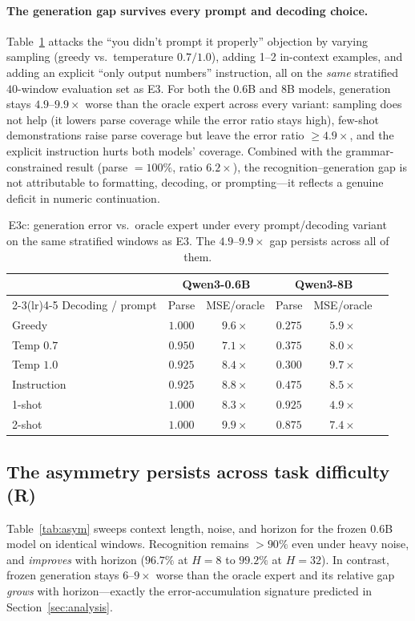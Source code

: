 \documentclass{article}
\begin{document}
\paragraph{The generation gap survives every prompt and decoding choice.}
Table~\ref{tab:genrob} attacks the ``you didn't prompt it properly'' objection
by varying sampling (greedy vs.\ temperature $0.7/1.0$), adding 1--2 in-context
examples, and adding an explicit ``only output numbers'' instruction, all on
the \emph{same} stratified $40$-window evaluation set as E3.  For both the
$0.6$B and $8$B models, generation stays $4.9$--$9.9\times$ worse than the
oracle expert across every variant: sampling does not help (it lowers parse
coverage while the error ratio stays high), few-shot demonstrations raise
parse coverage but leave the error ratio $\geq 4.9\times$, and the explicit
instruction hurts both models' coverage.  Combined with the
grammar-constrained result (parse $=100\%$, ratio $6.2\times$), the
recognition--generation gap is not attributable to formatting, decoding, or
prompting---it reflects a genuine deficit in numeric continuation.

\begin{table}[t]
\centering
\small
\begin{tabular}{lccccc}
\toprule
 & \multicolumn{2}{c}{Qwen3-0.6B} & \multicolumn{2}{c}{Qwen3-8B} \\
\cmidrule(lr){2-3}\cmidrule(lr){4-5}
Decoding / prompt & Parse & MSE/oracle & Parse & MSE/oracle \\
\midrule
Greedy & $1.000$ & $9.6\times$ & $0.275$ & $5.9\times$ \\
Temp $0.7$ & $0.950$ & $7.1\times$ & $0.375$ & $8.0\times$ \\
Temp $1.0$ & $0.925$ & $8.4\times$ & $0.300$ & $9.7\times$ \\
Instruction & $0.925$ & $8.8\times$ & $0.475$ & $8.5\times$ \\
1-shot & $1.000$ & $8.3\times$ & $0.925$ & $4.9\times$ \\
2-shot & $1.000$ & $9.9\times$ & $0.875$ & $7.4\times$ \\
\bottomrule
\end{tabular}
\caption{E3c: generation error vs.\ oracle expert under every prompt/decoding
variant on the same stratified windows as E3.  The $4.9$--$9.9\times$ gap
persists across all of them.}
\label{tab:genrob}
\end{table}

\subsection{The asymmetry persists across task difficulty (R)}
Table~\ref{tab:asym} sweeps context length, noise, and horizon for the frozen
$0.6$B model on identical windows.  Recognition remains $>90\%$ even under
heavy noise, and \emph{improves} with horizon ($96.7\%$ at $H{=}8$ to $99.2\%$
at $H{=}32$).  In contrast, frozen generation stays $6$--$9\times$ worse than
the oracle expert and its relative gap \emph{grows} with horizon---exactly the
error-accumulation signature predicted in Section~\ref{sec:analysis}.
\end{document}
